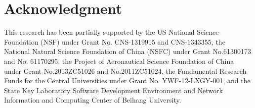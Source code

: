 \documentclass[conference]{IEEEtran}
\begin{document}
\section{Acknowledgment}
\label{ACKNOWLEDGMENTS}

 This research has been partially supported by the US National Science Foundation (NSF) under Grant No. CNS-1319915 and CNS-1343355, the National Natural Science Foundation of China (NSFC) under Grant No.61300173 and No. 61170295, the Project of Aeronautical Science Foundation of China under Grant No.2013ZC51026 and No.2011ZC51024, the Fundamental Research Funds for the Central Universities under Grant No. YWF-12-LXGY-001, and the State Key Laboratory Software Development Environment and Network Information and Computing Center of Beihang University.





%
%
%







\end{document}
